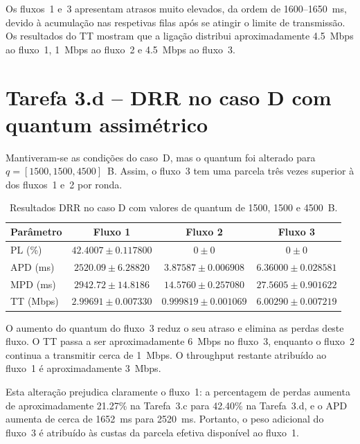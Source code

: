 \documentclass[11pt,a4paper]{article}
\begin{document}
Os fluxos~1 e~3 apresentam atrasos muito elevados, da ordem de 1600--1650~ms,
devido à acumulação nas respetivas filas após se atingir o limite de
transmissão. Os resultados do TT mostram que a ligação distribui aproximadamente
4.5~Mbps ao fluxo~1, 1~Mbps ao fluxo~2 e 4.5~Mbps ao fluxo~3.

\section{Tarefa 3.d -- DRR no caso D com quantum assimétrico}

Mantiveram-se as condições do caso~D, mas o quantum foi alterado para
$q=[1500,1500,4500]$~B. Assim, o fluxo~3 tem uma parcela três vezes superior
à dos fluxos~1 e~2 por ronda.

\begin{table}[htbp]
    \centering
    \caption{Resultados DRR no caso D com valores de quantum de 1500, 1500 e 4500~B.}
    \label{tab:3d}
    \begin{tabular}{lccc}
        \toprule
        Parâmetro & Fluxo 1 & Fluxo 2 & Fluxo 3 \\
        \midrule
        PL (\%) & $42.4007 \pm 0.117800$ &
                  $0 \pm 0$ &
                  $0 \pm 0$ \\
        APD (ms) & $2520.09 \pm 6.28820$ &
                   $3.87587 \pm 0.006908$ &
                   $6.36000 \pm 0.028581$ \\
        MPD (ms) & $2942.72 \pm 14.8186$ &
                   $14.5760 \pm 0.257080$ &
                   $27.5605 \pm 0.901622$ \\
        TT (Mbps) & $2.99691 \pm 0.007330$ &
                    $0.999819 \pm 0.001069$ &
                    $6.00290 \pm 0.007219$ \\
        \bottomrule
    \end{tabular}
\end{table}

O aumento do quantum do fluxo~3 reduz o seu atraso e elimina as perdas deste
fluxo. O TT passa a ser aproximadamente 6~Mbps no fluxo~3, enquanto o fluxo~2
continua a transmitir cerca de 1~Mbps. O throughput restante atribuído ao
fluxo~1 é aproximadamente 3~Mbps.

Esta alteração prejudica claramente o fluxo~1: a percentagem de perdas aumenta
de aproximadamente 21.27\% na Tarefa~3.c para 42.40\% na Tarefa~3.d, e o APD
aumenta de cerca de 1652~ms para 2520~ms. Portanto, o peso adicional do
fluxo~3 é atribuído às custas da parcela efetiva disponível ao fluxo~1.
\end{document}
